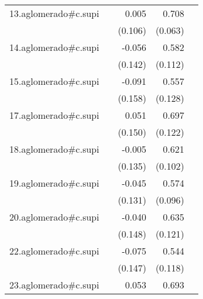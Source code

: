{\begin{longtable}{l*{4}{D{.}{.}{-1}}}
\addlinespace
13.aglomerado#c.supi&                     &       0.005         &       0.708\sym{***}&                     \\
            &                     &     (0.106)         &     (0.063)         &                     \\
\addlinespace
14.aglomerado#c.supi&                     &      -0.056         &       0.582\sym{***}&                     \\
            &                     &     (0.142)         &     (0.112)         &                     \\
\addlinespace
15.aglomerado#c.supi&                     &      -0.091         &       0.557\sym{***}&                     \\
            &                     &     (0.158)         &     (0.128)         &                     \\
\addlinespace
17.aglomerado#c.supi&                     &       0.051         &       0.697\sym{***}&                     \\
            &                     &     (0.150)         &     (0.122)         &                     \\
\addlinespace
18.aglomerado#c.supi&                     &      -0.005         &       0.621\sym{***}&                     \\
            &                     &     (0.135)         &     (0.102)         &                     \\
\addlinespace
19.aglomerado#c.supi&                     &      -0.045         &       0.574\sym{***}&                     \\
            &                     &     (0.131)         &     (0.096)         &                     \\
\addlinespace
20.aglomerado#c.supi&                     &      -0.040         &       0.635\sym{***}&                     \\
            &                     &     (0.148)         &     (0.121)         &                     \\
\addlinespace
22.aglomerado#c.supi&                     &      -0.075         &       0.544\sym{***}&                     \\
            &                     &     (0.147)         &     (0.118)         &                     \\
\addlinespace
23.aglomerado#c.supi&                     &       0.053         &       0.693\sym{***}&                     \\

\end{longtable}}
